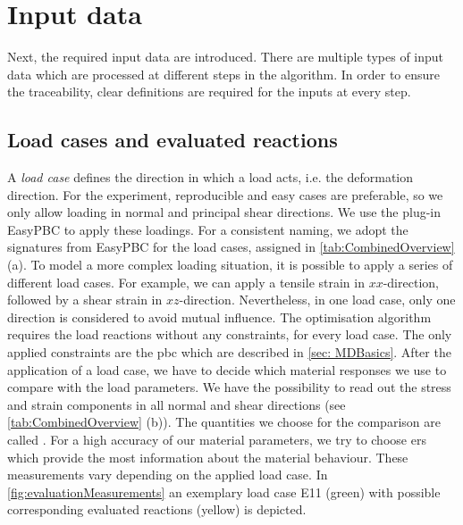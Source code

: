 \section{Input data} \label{sec: inputData}

Next, the required input data are introduced. There are multiple types of input data which are processed at different steps in the algorithm. In order to ensure the traceability, clear definitions are required for the inputs at every step. 

\subsection{Load cases and evaluated reactions}\label{subsec: loadCases}

A \emph{load case} defines the direction in which a load acts, i.e. the deformation direction.
For the experiment, reproducible and easy cases are preferable, so we only allow loading in normal and principal shear directions. We use the  plug-in EasyPBC to apply these loadings. For a consistent naming, we adopt the signatures from EasyPBC for the load cases, assigned in \autoref{tab:CombinedOverview} (a).
To model a more complex loading situation, it is possible to apply a series of different load cases.
For example, we can apply a tensile strain in $xx$-direction, followed by a shear strain in $xz$-direction.
Nevertheless, in one load case, only one direction is considered to avoid mutual influence. The optimisation algorithm requires the load reactions without any constraints, for every load case.
The only applied constraints are the \acrshort{pbc} which are described in \autoref{sec: MDBasics}. After the application of a load case, we have to decide which material responses we use to compare with the load parameters. We have the possibility to read out the stress and strain components in all normal and shear directions (see \autoref{tab:CombinedOverview} (b)). The quantities we choose for the comparison are called .
For a high accuracy of our material parameters, we try to choose \acrlong{er}s which provide the most information about the material behaviour. These measurements vary depending on the applied load case. In \autoref{fig:evaluationMeasurements} an exemplary load case E11 (green) with possible corresponding evaluated reactions (yellow) is depicted.

